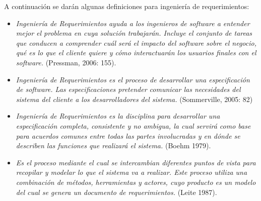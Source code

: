 \documentclass[11pt,oneside]{book}
\begin{document}
A continuación se darán algunas definiciones para ingeniería de requerimientos:
\begin{itemize}
\item \textit{Ingeniería de Requerimientos ayuda a los ingenieros de software a entender mejor el problema en cuya solución trabajarán. Incluye el conjunto de tareas que conducen a comprender cuál será el impacto del software sobre el negocio, qué es lo que el cliente quiere y cómo interactuarán los usuarios finales con el software.} (Pressman, 2006: 155).

\item \textit{Ingeniería de Requerimientos es el proceso de desarrollar una especificación de software. Las especificaciones pretender comunicar las necesidades del sistema del cliente a los desarrolladores del sistema.} (Sommerville, 2005: 82) 

\item \textit{Ingeniería de Requerimientos es la disciplina para desarrollar una especificación completa, consistente y no ambigua, la cual servirá como base para acuerdos comunes entre todas las partes involucradas y en dónde se describen las funciones que realizará el sistema.} (Boehm 1979).

\item \textit{Es el proceso mediante el cual se intercambian diferentes puntos de vista para recopilar y modelar lo que el sistema va a realizar. Este proceso utiliza una combinación de métodos, herramientas y actores, cuyo producto es un modelo del cual se genera un documento de requerimientos.} (Leite 1987).
\end{itemize}
\end{document}
